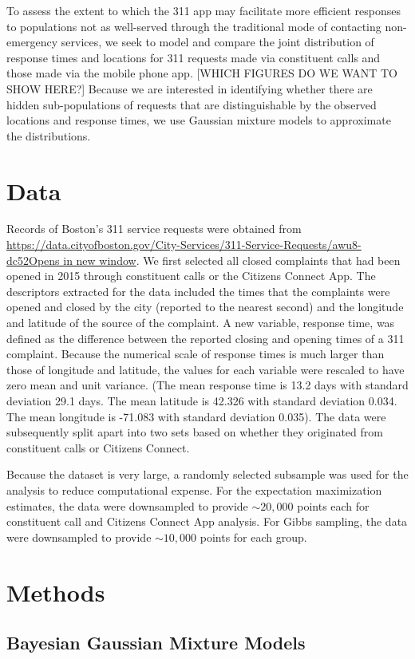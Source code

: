 \documentclass[twoside]{article}
\theoremstyle{theorem}
\theoremstyle{theorem}
\theoremstyle{theorem}
\theoremstyle{lemma}
\theoremstyle{definition}
\theoremstyle{example}
\begin{document}
To assess the extent to which the 311 app may facilitate more efficient responses to populations not as well-served through the traditional mode of contacting non-emergency services, we seek to model and compare the joint distribution of response times and locations for 311 requests made via constituent calls and those made via the mobile phone app. [WHICH FIGURES DO WE WANT TO SHOW HERE?] Because we are interested in identifying whether there are hidden sub-populations of requests that are distinguishable by the observed locations and response times, we use Gaussian mixture models to approximate the distributions. 

\section{Data}
Records of Boston's 311 service requests were obtained from \url{https://data.cityofboston.gov/City-Services/311-Service-Requests/awu8-dc52Opens in new window}. We first selected all closed complaints that had been opened in 2015 through constituent calls or the Citizens Connect App. The descriptors extracted for the data included the times that the complaints were opened and closed by the city (reported to the nearest second) and the longitude and latitude of the source of the complaint. A new variable, response time, was defined as the difference between the reported closing and opening times of a 311 complaint. Because the numerical scale of response times is much larger than those of longitude and latitude, the values for each variable were rescaled to have zero mean and unit variance. (The mean response time is 13.2 days with standard deviation 29.1 days. The mean latitude is 42.326 with standard deviation 0.034. The mean longitude is -71.083 with standard deviation 0.035). The data were subsequently split apart into two sets based on whether they originated from constituent calls or Citizens Connect. 

Because the dataset is very large, a randomly selected subsample was used for the analysis to reduce computational expense. For the expectation maximization estimates, the data were downsampled to provide $\sim20,000$ points each for constituent call and Citizens Connect App analysis. For Gibbs sampling, the data were downsampled to provide $\sim10,000$ points for each group. 
\section{Methods}
\subsection{Bayesian Gaussian Mixture Models}
\end{document}

